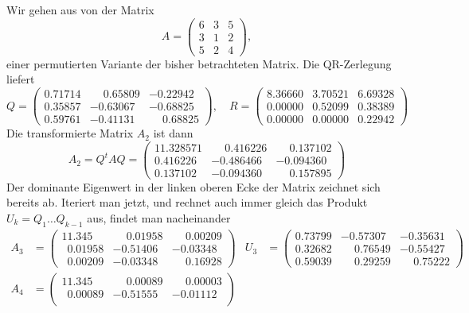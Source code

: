 \begin{beispiel}
Wir gehen aus von der Matrix
\[
A=\begin{pmatrix}
6&3&5\\
3&1&2\\
5&2&4
\end{pmatrix},
\]
einer permutierten Variante der bisher betrachteten Matrix. Die
QR-Zerlegung liefert
\[
Q=\begin{pmatrix}
   0.71714&  \phantom{-}0.65809& -0.22942\\
   0.35857& -0.63067& -0.68825\\
   0.59761& -0.41131& \phantom{-}0.68825
\end{pmatrix},
\quad
R=\begin{pmatrix}
   8.36660&  3.70521&  6.69328\\
   0.00000&  0.52099&  0.38389\\
   0.00000&  0.00000&  0.22942
\end{pmatrix}
\]
Die transformierte Matrix $A_2$ ist dann
\[
A_2=Q^tAQ=\begin{pmatrix}
   11.328571&  \phantom{-}0.416226&  \phantom{-}0.137102\\
    0.416226&  -0.486466&  -0.094360\\
    0.137102&  -0.094360&  \phantom{-}0.157895
\end{pmatrix}
\]
Der dominante Eigenwert in der linken oberen Ecke der Matrix zeichnet
sich bereits ab. Iteriert man jetzt, und rechnet auch immer gleich
das Produkt $U_k=Q_1\dots Q_{k-1}$ aus, findet man nacheinander
\begin{align*}
A_3&=\begin{pmatrix}
             11.345\phantom{00}&  \phantom{-}0.01958&   \phantom{-}0.00209\\
   \phantom{0}0.01958          &  -0.51406&  -0.03348\\
   \phantom{0}0.00209          &  -0.03348&  \phantom{-}0.16928
\end{pmatrix}&
U_3&=\begin{pmatrix}
   0.73799& -0.57307& -0.35631\\
   0.32682& \phantom{-}0.76549& -0.55427\\
   0.59039& \phantom{-}0.29259& \phantom{-}0.75222
\end{pmatrix}
\\
A_4&=\begin{pmatrix}
   11.345\phantom{00} &  \phantom{-}0.00089&  \phantom{-}0.00003\\
   \phantom{0}0.00089& -0.51555& -0.01112\\

\end{pmatrix}
\end{align*}
\end{beispiel}
